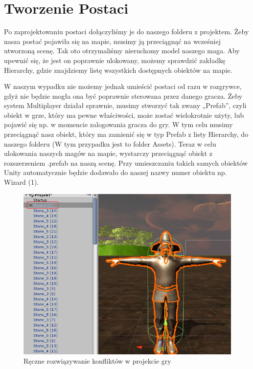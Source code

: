 \documentclass[openright]{xmgr}
\begin{document}
  \section{Tworzenie Postaci}

    Po zaprojektowaniu postaci dołączyliśmy je do naszego folderu z projektem. Żeby nasza postać pojawiła się na mapie, musimy ją przeciągnąć na wcześniej utworzoną scenę. Tak oto otrzymaliśmy nieruchomy model naszego maga. Aby upewnić się, że jest on poprawnie ulokowany, możemy sprawdzić zakładkę Hierarchy, gdzie znajdziemy listę wszystkich dostępnych obiektów na mapie. 

    W naszym wypadku nie możemy jednak umieścić postaci od razu w rozgrywce, gdyż nie będzie mogła ona być poprawnie sterowana przez danego gracza. Żeby system Multiplayer działał sprawnie, musimy stworzyć tak zwany „Prefab”, czyli obiekt w grze, który ma pewne właściwości, może zostać wielokrotnie użyty, lub pojawić się np. w momencie zalogowania gracza do gry. W tym celu musimy przeciągnąć nasz obiekt, który ma zamienić się w typ Prefab z listy Hierarchy, do naszego folderu (W tym przypadku jest to folder Assets). Teraz w celu ulokowania naszych magów na mapie, wystarczy przeciągnąć obiekt z rozszerzeniem .prefab na naszą scenę. Przy umieszczaniu takich samych obiektów Unity automatycznie będzie dodawało do naszej nazwy numer obiektu np. Wizard (1). 

    \begin{figure}[H]
      \center
      \includegraphics[width=\textwidth]{prefab.png}
      \caption{Ręczne rozwiązywanie konfliktów w projekcie gry}
    \end{figure}
\end{document}
